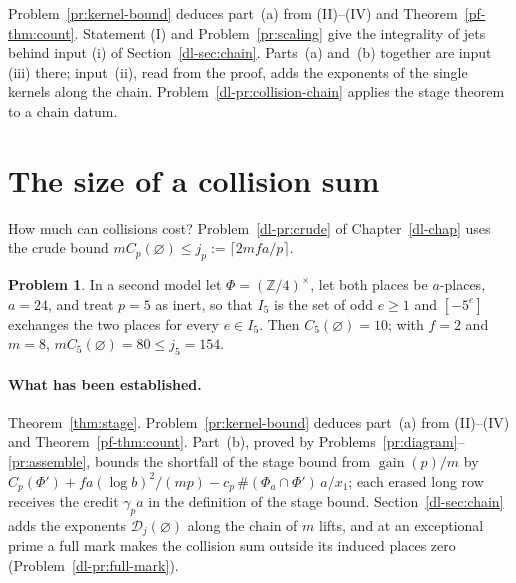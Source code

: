 \documentclass[reqno]{amsart}
\newcounter{chap}
\theoremstyle{plain}
\theoremstyle{definition}
\newtheorem{problem}{Problem}[section]
\theoremstyle{remark}
\newcommand{\Z}{{\mathbb{Z}}}
\newcommand{\Dc}{\mathcal D}
\newcommand{\gain}{\operatorname{gain}}
\begin{document}
Problem~\ref{pr:kernel-bound} deduces part~(a) from (II)--(IV) and Theorem~\ref{pf-thm:count}.  Statement (I) and Problem~\ref{pr:scaling} give the integrality of jets behind input (i) of Section~\ref{dl-sec:chain}.  Parts~(a) and~(b) together are input (iii) there; input~(ii), read from the proof, adds the exponents of the single kernels along the chain.  Problem~\ref{dl-pr:collision-chain} applies the stage theorem to a chain datum.

\section{The size of a collision sum}\label{sec:collision-size}

How much can collisions cost?  Problem~\ref{dl-pr:crude} of Chapter~\ref{dl-chap} uses the crude bound \(m C_p(\varnothing) \le j_p := \lceil 2mfa/p \rceil\).

\begin{problem}\label{pr:two-places}
In a second model let \(\Phi = (\Z/4)^\times\), let both places be \(a\)-places, \(a = 24\), and treat \(p = 5\) as inert, so that \(I_5\) is the set of odd \(e \ge 1\) and \([-5^e]\) exchanges the two places for every \(e \in I_5\).  Then \(C_5(\varnothing) = 10\); with \(f = 2\) and \(m = 8\), \(m C_5(\varnothing) = 80 \le j_5 = 154\).
\end{problem}

\paragraph{What has been established.}  Theorem~\ref{thm:stage}.  Problem~\ref{pr:kernel-bound} deduces part~(a) from (II)--(IV) and Theorem~\ref{pf-thm:count}.  Part~(b), proved by Problems~\ref{pr:diagram}--\ref{pr:assemble}, bounds the shortfall of the stage bound from \(\gain(p)/m\) by \(C_p(\Phi') + fa(\log b)^2/(mp) - c_p\, \#(\Phi_a \cap \Phi')\, a/x_1\); each erased long row receives the credit \(\gamma_p a\) in the definition of the stage bound.  Section~\ref{dl-sec:chain} adds the exponents \(\Dc_j(\varnothing)\) along the chain of \(m\) lifts, and at an exceptional prime a full mark makes the collision sum outside its induced places zero (Problem~\ref{dl-pr:full-mark}).
\end{document}
